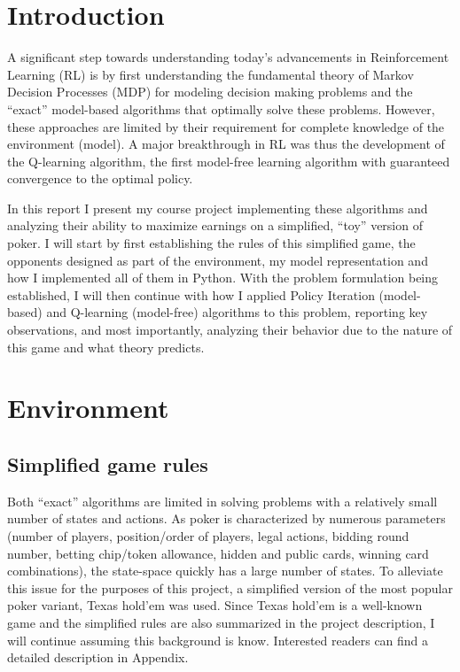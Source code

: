\section{Introduction}

A significant step towards understanding today's advancements in Reinforcement Learning (RL) is by first understanding the fundamental theory of Markov Decision Processes (MDP) for modeling decision making problems and the ``exact'' model-based algorithms that optimally solve these problems. However, these approaches are limited by their requirement for complete knowledge of the environment (model). A major breakthrough in RL was thus the development of the Q-learning algorithm, the first model-free learning algorithm with guaranteed convergence to the optimal policy.

In this report I present my course project implementing these algorithms and analyzing their ability to maximize earnings on a simplified, ``toy'' version of poker. I will start by first establishing the rules of this simplified game, the opponents designed as part of the environment, my model representation and how I implemented all of them in Python. With the problem formulation being established, I will then continue with how I applied Policy Iteration (model-based) and Q-learning (model-free) algorithms to this problem, reporting key observations, and most importantly, analyzing their behavior due to the nature of this game and what theory predicts.

\section{Environment}

\subsection{Simplified game rules}

Both ``exact'' algorithms are limited in solving problems with a relatively small number of states and actions. As poker is characterized by numerous parameters (number of players, position/order of players, legal actions, bidding round number, betting chip/token allowance, hidden and public cards, winning card combinations), the state-space quickly has a large number of states. To alleviate this issue for the purposes of this project, a simplified version of the most popular poker variant, Texas hold'em was used. Since Texas hold'em is a well-known game and the simplified rules are also summarized in the project description, I will continue assuming this background is know. Interested readers can find a detailed description in Appendix.

